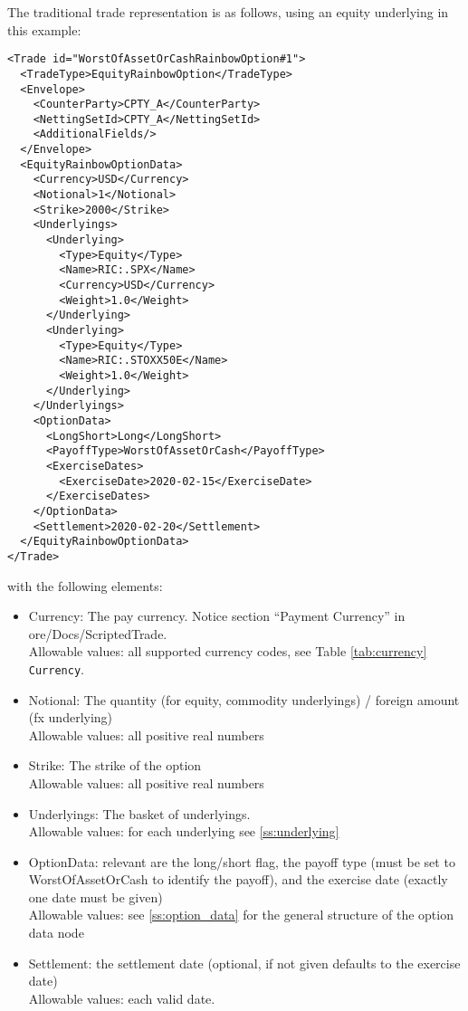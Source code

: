 The traditional trade representation is as follows, using an equity underlying in this example:

\begin{verbatim}
<Trade id="WorstOfAssetOrCashRainbowOption#1">
  <TradeType>EquityRainbowOption</TradeType>
  <Envelope>
    <CounterParty>CPTY_A</CounterParty>
    <NettingSetId>CPTY_A</NettingSetId>
    <AdditionalFields/>
  </Envelope>
  <EquityRainbowOptionData>
    <Currency>USD</Currency>
    <Notional>1</Notional>
    <Strike>2000</Strike>
    <Underlyings>
      <Underlying>
        <Type>Equity</Type>
        <Name>RIC:.SPX</Name>
        <Currency>USD</Currency>
        <Weight>1.0</Weight>
      </Underlying>
      <Underlying>
        <Type>Equity</Type>
        <Name>RIC:.STOXX50E</Name>
        <Weight>1.0</Weight>
      </Underlying>
    </Underlyings>
    <OptionData>
      <LongShort>Long</LongShort>
      <PayoffType>WorstOfAssetOrCash</PayoffType>
      <ExerciseDates>
        <ExerciseDate>2020-02-15</ExerciseDate>
      </ExerciseDates>
    </OptionData>
    <Settlement>2020-02-20</Settlement>
  </EquityRainbowOptionData>
</Trade>
\end{verbatim}

with the following elements:

\begin{itemize}
\item Currency: The pay currency. Notice section ``Payment Currency'' in ore/Docs/ScriptedTrade. \\
  Allowable values: all supported currency codes, see Table \ref{tab:currency} \lstinline!Currency!.
\item Notional: The quantity (for equity, commodity underlyings) / foreign amount (fx underlying) \\
  Allowable values: all positive real numbers
\item Strike: The strike of the option \\
  Allowable values: all positive real numbers
\item Underlyings: The basket of underlyings. \\
  Allowable values: for each underlying see \ref{ss:underlying}
\item OptionData: relevant are the long/short flag, the payoff type (must be set to WorstOfAssetOrCash to
  identify the payoff), and the exercise date (exactly one date must be given) \\
  Allowable values: see \ref{ss:option_data} for the general structure of the option data node
\item Settlement: the settlement date (optional, if not given defaults to the exercise date) \\
  Allowable values: each valid date.
\end{itemize}

